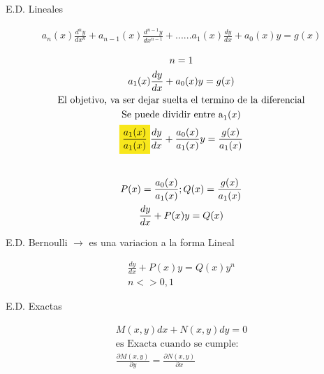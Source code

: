 \documentclass{article}
\begin{document}
E.D. Lineales 


\begin{gather*}
a_{n}(x)\frac{d^{n}y}{dx^{n}}+a_{n-1}(x)\frac{d^{n-1}y}{dx^{n-1}}+......a_{1}(x)\frac{dy}{dx}+ a_{0}(x)y = g(x)
\end{gather*}



\begin{gather*}
n=1 \\
a_{1}(x)\frac{dy}{dx}+a_{0}(x)y=g(x) \\
\text{El objetivo, va  ser dejar suelta el termino de la diferencial} \\
\text{Se puede dividir entre a}_{1}(x) \\
\text{\colorbox[RGB]{248,231,28}{$\frac{a_{1}(x)}{a_{1}(x)}$}}\frac{dy}{dx}+\frac{a_{0}(x)}{a_{1}(x)}y=\frac{g(x)}{a_{1}(x)} \\
\vspace{0.5em} \\
P(x) =\frac{a_{0}(x)}{a_{1}(x)}  ;    Q(x) = \frac{g(x)}{a_{1}(x)} \\
\frac{dy}{dx}+P(x)y=Q(x)
\end{gather*}


E.D. Bernoulli $\rightarrow$  es una variacion a la forma Lineal


\begin{gather*}
\frac{dy}{dx}+P(x)y=Q(x)y^{n} \\
n<> 0,1
\end{gather*}


E.D. Exactas


\begin{gather*}
M(x,y)dx +N(x,y)dy = 0 \\
\text{es Exacta cuando se cumple:} \\
\frac{\partial M(x,y)}{\partial y} =\frac{\partial N(x,y)}{\partial x} 
\end{gather*}
\end{document}
